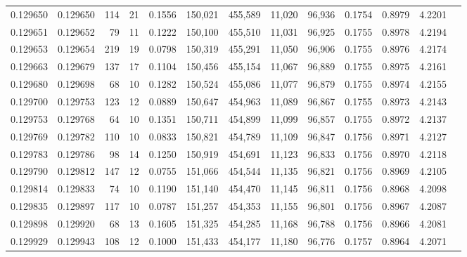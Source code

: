 \begin{tabular}{rrrrrrrrrrrrr}
0.129650 & 0.129650 &   114 &  21 &                                     0.1556 & 150,021 & 455,589 &  11,020 &  96,936 & 0.1754 & 0.8979 & 4.2201 \\
0.129651 & 0.129652 &    79 &  11 &                                     0.1222 & 150,100 & 455,510 &  11,031 &  96,925 & 0.1755 & 0.8978 & 4.2194 \\
0.129653 & 0.129654 &   219 &  19 &                                     0.0798 & 150,319 & 455,291 &  11,050 &  96,906 & 0.1755 & 0.8976 & 4.2174 \\
0.129663 & 0.129679 &   137 &  17 &                                     0.1104 & 150,456 & 455,154 &  11,067 &  96,889 & 0.1755 & 0.8975 & 4.2161 \\
0.129680 & 0.129698 &    68 &  10 &                                     0.1282 & 150,524 & 455,086 &  11,077 &  96,879 & 0.1755 & 0.8974 & 4.2155 \\
0.129700 & 0.129753 &   123 &  12 &                                     0.0889 & 150,647 & 454,963 &  11,089 &  96,867 & 0.1755 & 0.8973 & 4.2143 \\
0.129753 & 0.129768 &    64 &  10 &                                     0.1351 & 150,711 & 454,899 &  11,099 &  96,857 & 0.1755 & 0.8972 & 4.2137 \\
0.129769 & 0.129782 &   110 &  10 &                                     0.0833 & 150,821 & 454,789 &  11,109 &  96,847 & 0.1756 & 0.8971 & 4.2127 \\
0.129783 & 0.129786 &    98 &  14 &                                     0.1250 & 150,919 & 454,691 &  11,123 &  96,833 & 0.1756 & 0.8970 & 4.2118 \\
0.129790 & 0.129812 &   147 &  12 &                                     0.0755 & 151,066 & 454,544 &  11,135 &  96,821 & 0.1756 & 0.8969 & 4.2105 \\
0.129814 & 0.129833 &    74 &  10 &                                     0.1190 & 151,140 & 454,470 &  11,145 &  96,811 & 0.1756 & 0.8968 & 4.2098 \\
0.129835 & 0.129897 &   117 &  10 &                                     0.0787 & 151,257 & 454,353 &  11,155 &  96,801 & 0.1756 & 0.8967 & 4.2087 \\
0.129898 & 0.129920 &    68 &  13 &                                     0.1605 & 151,325 & 454,285 &  11,168 &  96,788 & 0.1756 & 0.8966 & 4.2081 \\
0.129929 & 0.129943 &   108 &  12 &                                     0.1000 & 151,433 & 454,177 &  11,180 &  96,776 & 0.1757 & 0.8964 & 4.2071 \\

\end{tabular}
